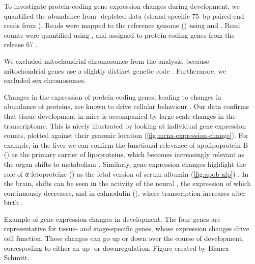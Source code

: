 To investigate protein-coding gene expression changes during development, we
quantified the \mrna abundance from \rrna-depleted \rnaseq data (strand-specific
\SI{75}{bp} paired-end reads from  ). Reads were
mapped to the \mmu reference genome () using
 \citep{Fonseca:2014} and 
\citep{Kim:2013}. Read counts were quantified using 
\citep{Anders:2014}, and assigned to protein-coding genes from the
 release \num{67} \citep{Flicek:2014}.

We excluded mitochondrial chromosomes from the analysis, because mitochondrial
genes use a slightly distinct genetic code \citep{Osawa:1989}. Furthermore, we
excluded sex chromosomes.

Changes in the expression of protein-coding genes, leading to changes in
abundance of proteins, are known to drive cellular behaviour
\citep{Brawand:2011}. Our data confirms that tissue development in mice is
accompanied by large-scale changes in the \mrna transcriptome. This is nicely
illustrated by looking at individual gene expression counts, plotted against
their genomic location (\cref{fig:mrna-expression-change}). For example, in the
liver we can confirm the functional relevance of apolipoprotein B
() as the primary carrier of lipoproteins, which becomes
increasingly relevant as the organ shifts to metabolism \citep{Knott:1986}.
Similarly, \mrna gene expression changes highlight the role of α-fetoproteine
() as the fetal version of serum albumin (\cref{fig:apob-afp})
\citep{Chen:1997}. In the brain, shifts can be seen in the activity of the
neural \tf {}, the expression of which continuously decreases, and
in calmodulin (), where transcription increases after birth
\citep{Tsui:2013,Huang:2011}.

    {Example of gene expression changes in development.}
    {The four genes are representative for tissue- and stage-specific genes,
    whose expression changes drive cell function. These changes can go up or
    down over the course of development, correspoding to either an up- or
    downregulation. Figure created by Bianca Schmitt.}

